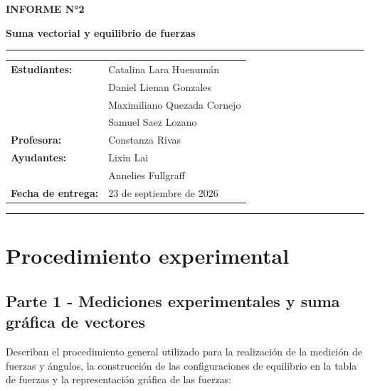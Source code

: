 \documentclass[12pt,a4paper]{article}
\begin{document}
\begin{center}
{\Large\textbf{INFORME N°2}}

{\LARGE\textbf{Suma vectorial y equilibrio de fuerzas}}

\rule{\textwidth}{0.5pt}

\begin{tabular}{ll}
    \textbf{Estudiantes:} & Catalina Lara Huenumán \\
                          & Daniel Lienan Gonzales \\
                          & Maximiliano Quezada Cornejo \\
                          & Samuel Saez Lozano \\[0.2cm]
    \textbf{Profesora:}   & Constanza Rivas \\
    \textbf{Ayudantes:}    & Lixin Lai \\
                           & Annelies Fullgraff \\[0.2cm]
    \textbf{Fecha de entrega:} & 23 de septiembre de 2026
\end{tabular}

\vspace{0.4cm}
\rule{\textwidth}{0.5pt}

\end{center}

\section{Procedimiento experimental}

\subsection{Parte 1 - Mediciones experimentales y suma gráfica de vectores} \label{Procedimiento-Parte-1}

Describan el procedimiento general utilizado para la realización de la medición de fuerzas y ángulos, la construcción de las configuraciones de equilibrio en la tabla de fuerzas y la representación gráfica de las fuerzas:
\end{document}

